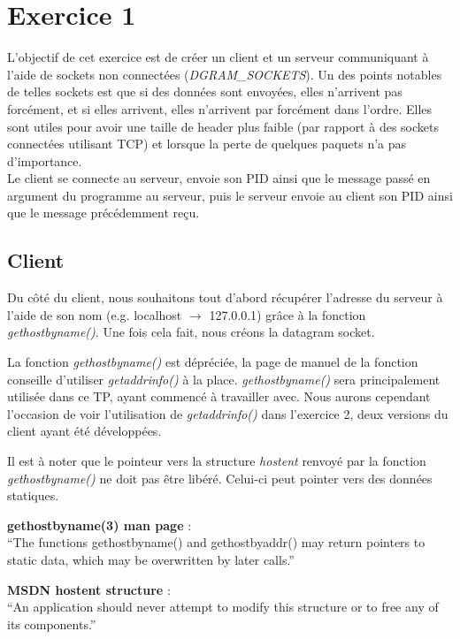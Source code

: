 \section{Exercice 1}
L'objectif de cet exercice est de créer un client et un serveur communiquant à l'aide de sockets non connectées (\emph{DGRAM\_SOCKETS}). Un des points notables de telles sockets est que si des données sont envoyées, elles n'arrivent pas forcément, et si elles arrivent, elles n'arrivent par forcément dans l'ordre. Elles sont utiles pour avoir une taille de header plus faible (par rapport à des sockets connectées utilisant TCP) et lorsque la perte de quelques paquets n'a pas d'importance.\\

Le client se connecte au serveur, envoie son PID ainsi que le message passé en argument du programme au serveur, puis le serveur envoie au client son PID ainsi que le message précédemment reçu.

\subsection{Client}
Du côté du client, nous souhaitons tout d'abord récupérer l'adresse du serveur à l'aide de son nom (e.g. localhost $\rightarrow$ 127.0.0.1) grâce à la fonction \emph{gethostbyname()}. Une fois cela fait, nous créons la datagram socket.\\

\begin{mdframed}[backgroundcolor=hintbg, linecolor=hintborder]
La fonction \emph{gethostbyname()} est dépréciée, la page de manuel de la fonction conseille d'utiliser \emph{getaddrinfo()} à la place. \emph{gethostbyname()} sera principalement utilisée dans ce TP, ayant commencé à travailler avec. Nous aurons cependant l'occasion de voir l'utilisation de \emph{getaddrinfo()} dans l'exercice 2, deux versions du client ayant été développées.
\end{mdframed}

\begin{mdframed}[backgroundcolor=lightblue2, linecolor=darkblue]
Il est à noter que le pointeur vers la structure \emph{hostent} renvoyé par la fonction \emph{gethostbyname()} ne doit pas être libéré. Celui-ci peut pointer vers des données statiques.

\begin{mdframed}[backgroundcolor=lightblue, linecolor=darkblue]
	\textbf{gethostbyname(3) man page} :\\
	``The functions gethostbyname() and gethostbyaddr() may  return  pointers to  static  data, which may be overwritten by later calls.'' \cite{cite:man_gethostbyname}
\end{mdframed}
\begin{mdframed}[backgroundcolor=lightblue, linecolor=darkblue]
	\noindent\textbf{MSDN hostent structure} :\\
	``An application should never attempt to modify this structure or to free any of its components.'' \cite{cite:msdn_hostent}
\end{mdframed}
\end{mdframed}
\

